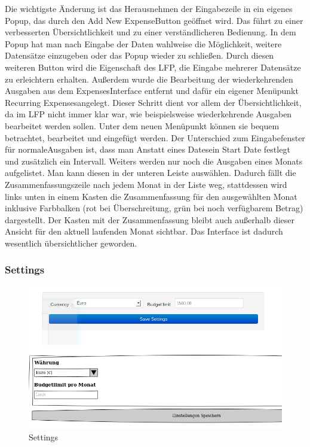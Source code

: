\documentclass[a4paper,10pt]{article}
\begin{document}
Die wichtigste \"Anderung ist das Herausnehmen der Eingabezeile in ein eigenes Popup,
das durch den \glqq Add New Expense\grqq\space Button
ge\"offnet wird. Das f\"uhrt zu einer verbesserten \"Ubersichtlichkeit und zu einer verst\"andlicheren Bedienung.
In dem Popup hat man nach Eingabe der Daten wahlweise die M\"oglichkeit, weitere Datens\"atze einzugeben oder das Popup wieder
zu schlie\ss en. Durch diesen weiteren Button wird die Eigenschaft des LFP, die
Eingabe mehrerer Datens\"atze zu erleichtern erhalten. Au\ss erdem wurde die Bearbeitung der wiederkehrenden Ausgaben aus dem
\glqq Expenses\grqq\space Interface entfernt und daf\"ur
ein eigener Men\"upunkt \glqq Recurring Expenses\grqq\space angelegt. Dieser Schritt
dient vor allem der \"Ubersichtlichkeit, da im LFP nicht immer klar war, wie
beispielsweise wiederkehrende Ausgaben bearbeitet werden sollen. Unter dem neuen
Men\"upunkt k\"onnen sie bequem betrachtet, bearbeitet und eingef\"ugt werden. Der Unterschied zum
Eingabefenster f\"ur \glqq normale\grqq\space Ausgaben ist,
dass man Anstatt eines \glqq Dates\grqq\space ein \glqq Start Date\grqq\space
festlegt und zus\"atzlich ein Intervall.
Weiters werden nur noch die Ausgaben eines Monats aufgelistet. Man kann diesen in der
unteren Leiste ausw\"ahlen. Dadurch f\"allt
die Zusammenfassungszeile nach jedem Monat in der Liste weg, stattdessen wird links unten in einem Kasten die Zusammenfassung
f\"ur den ausgew\"ahlten Monat inklusive Farbbalken (rot bei \"Uberschreitung, gr\"un bei noch verf\"ugbarem Betrag) dargestellt.
Der Kasten mit der Zusammenfassung bleibt auch au\ss erhalb dieser Ansicht f\"ur den
aktuell laufenden Monat sichtbar.
Das Interface ist dadurch wesentlich \"ubersichtlicher geworden.

\clearpage
\subsubsection{Settings}

\begin{figure}
\centering
\includegraphics[width=\textwidth]{settings}
\caption{Settings} \label{fig:settings}
\end{figure}
\end{document}
